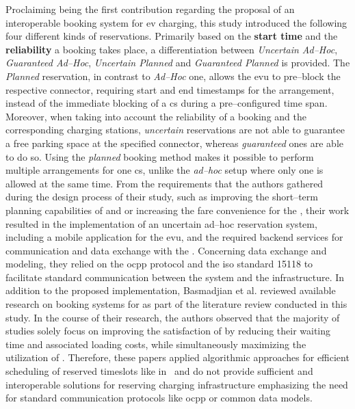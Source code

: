 Proclaiming being the first contribution regarding the proposal of an interoperable booking system for \acrshort{ev} charging, this study introduced the following four different kinds of reservations. Primarily based on the \textbf{start time} and the \textbf{reliability} a booking takes place, a differentiation between \textit{Uncertain Ad--Hoc}, \textit{Guaranteed Ad--Hoc}, \textit{Uncertain Planned} and \textit{Guaranteed Planned} is provided.
The \textit{Planned} reservation, in contrast to \textit{Ad--Hoc} one, allows the \acrshort{evu} to pre--block the respective connector, requiring start and end timestamps for the arrangement, instead of the immediate blocking of a \acrshort{cs} during a pre--configured time span.
Moreover, when taking into account the reliability of a booking and the corresponding charging stations, \textit{uncertain} reservations are not able to guarantee a free parking space at the specified connector, whereas \textit{guaranteed} ones are able to do so.
Using the \textit{planned} booking method makes it possible to perform multiple arrangements for one \acrshort{cs}, unlike the \textit{ad--hoc} setup where only one is allowed at the same time.
From the requirements that the authors gathered during the design process of their study, such as improving the short--term planning capabilities of  and  or increasing the fare convenience for the , their work resulted in the implementation of an uncertain ad--hoc reservation system, including a mobile application for the \acrshort{evu}, and the required backend services for communication and data exchange with the .
Concerning data exchange and modeling, they relied on the \acrshort{ocpp} protocol and the \acrshort{iso} standard 15118 to facilitate standard communication between the system and the infrastructure.
In addition to the proposed implementation, Basmadjian et al. reviewed available research on booking systems for  as part of the literature review conducted in this study.
In the course of their research, the authors observed that the majority of studies solely focus on improving the satisfaction of  by reducing their waiting time and associated loading costs, while simultaneously maximizing the utilization of .
Therefore, these papers applied algorithmic approaches for efficient scheduling of reserved timeslots like in~\cite{kim_efficient_2010,xiang_reservation-based_2011,qin_charging_2011} and do not provide sufficient and interoperable solutions for reserving charging infrastructure emphasizing the need for standard communication protocols like \acrshort{ocpp} or common data models.
